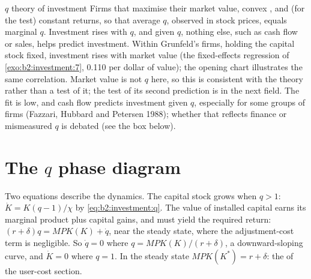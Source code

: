 \begin{model}{$q$ theory of investment}
\assumes Firms that maximise their market value, convex , and (for the test) constant returns, so that
average $q$, observed in stock prices, equals marginal $q$.
\predicts Investment rises with $q$, and given $q$, nothing else, such as cash flow or sales, helps predict investment.
\tested Within Grunfeld's firms, holding the capital stock fixed, investment rises with market value (the fixed-effects
regression of \cref{exo:b2:investment:7}, 0.110 per dollar of value); the opening chart illustrates the same correlation.
Market value is not $q$ here, so this is consistent with the theory rather than a test of it; the test of its second
prediction is in the next field.
\breaks The fit is low, and cash flow predicts investment given $q$, especially for some groups of firms (Fazzari,
Hubbard and Petersen 1988); whether that reflects finance or mismeasured $q$ is debated (see the box below).
\end{model}

\section{The \texorpdfstring{$q$}{q} phase diagram}\label{sec:b2:investment:phase}

Two equations describe the dynamics. The capital stock grows when $q > 1$: $\dot K = K(q - 1)/\chi$ by \eqref{eq:b2:investment:q}. The value of installed capital earns its
marginal product plus capital gains, and must yield the required return: $(r + \delta)q = \mathit{MPK}(K) + \dot q$, near the steady state, where the
adjustment-cost term is negligible. So $\dot q = 0$ where $q = \mathit{MPK}(K)/(r + \delta)$, a downward-sloping curve, and $\dot K = 0$ where $q = 1$. In the steady state $\mathit{MPK}(K^*) = r + \delta$: the  of the user-cost section.

